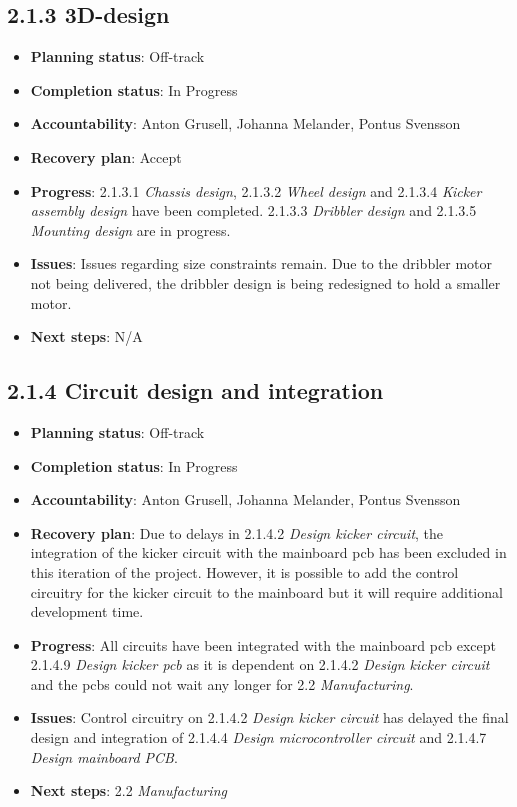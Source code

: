 
\subsection*{2.1.3 3D-design}
\begin{itemize}
    \item \textbf{Planning status}: Off-track
    \item \textbf{Completion status}: In Progress
    \item \textbf{Accountability}: Anton Grusell, Johanna Melander, Pontus Svensson
    \item \textbf{Recovery plan}: Accept
    \item \textbf{Progress}: 2.1.3.1 \textit{Chassis design}, 2.1.3.2 \textit{Wheel design} and 2.1.3.4 \textit{Kicker assembly design} have been completed. 2.1.3.3 \textit{Dribbler design}  and 2.1.3.5 \textit{Mounting design} are in progress.
    \item \textbf{Issues}: Issues regarding size constraints remain. Due to the dribbler motor not being delivered, the dribbler design is being redesigned to hold a smaller motor.
    \item \textbf{Next steps}: N/A
\end{itemize}


\subsection*{2.1.4 Circuit design and integration}
\begin{itemize}
    \item \textbf{Planning status}: Off-track
    \item \textbf{Completion status}: In Progress
    \item \textbf{Accountability}: Anton Grusell, Johanna Melander, Pontus Svensson
    \item \textbf{Recovery plan}: Due to delays in 2.1.4.2 \textit{Design kicker circuit}, the integration of the kicker circuit with the mainboard \ac{pcb} has been excluded in this iteration of the project. However, it is possible to add the control circuitry for the kicker circuit to the mainboard but it will require additional development time. 
    \item \textbf{Progress}: All circuits have been integrated with the mainboard \ac{pcb} except 2.1.4.9 \textit{Design kicker \ac{pcb}} as it is dependent on 2.1.4.2 \textit{Design kicker circuit} and the \acp{pcb} could not wait any longer for 2.2 \textit{Manufacturing}.
    \item \textbf{Issues}: Control circuitry on 2.1.4.2 \textit{Design kicker circuit} has delayed the final design and integration of 2.1.4.4 \textit{Design microcontroller circuit} and 2.1.4.7 \textit{Design mainboard PCB}.
    \item \textbf{Next steps}: 2.2 \textit{Manufacturing}
\end{itemize}

